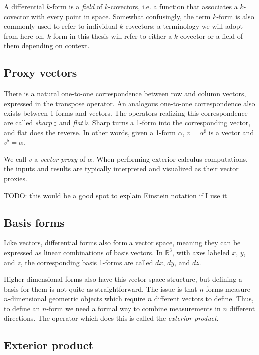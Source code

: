 \documentclass[utf8,english]{gradu3}
\begin{document}
A differential $k$-form is a \textit{field} of $k$-covectors,
i.e. a function that associates a $k$-covector with every point in space.
Somewhat confusingly, the term $k$-form is also commonly used to
refer to individual $k$-covectors;
a terminology we will adopt from here on.
$k$-form in this thesis will refer to either a $k$-covector
or a field of them depending on context.


\subsection{Proxy vectors}

There is a natural one-to-one correspondence between row and column vectors,
expressed in the transpose operator.
An analogous one-to-one correspondence also exists between 1-forms and vectors.
The operators realizing this correspondence are called
\textit{sharp} $\sharp$ and \textit{flat} $\flat$.
Sharp turns a 1-form into the corresponding vector,
and flat does the reverse.
In other words, given a 1-form $\alpha$,
$v = \alpha^{\sharp}$ is a vector and $v^{\flat} = \alpha$.

We call $v$ a \textit{vector proxy} of $\alpha$.
When performing exterior calculus computations,
the inputs and results are typically interpreted
and visualized as their vector proxies.

TODO: this would be a good spot to explain Einstein notation if I use it


\subsection{Basis forms}

Like vectors, differential forms also form a vector space,
meaning they can be expressed as linear combinations of basis vectors.
In $\mathbb{R}^3$, with axes labeled $x$, $y$, and $z$,
the corresponding basis 1-forms are called $dx$, $dy$, and $dz$.

Higher-dimensional forms also have this vector space structure,
but defining a basis for them is not quite as straightforward.
The issue is that $n$-forms measure $n$-dimensional geometric objects
which require $n$ different vectors to define.
Thus, to define an $n$-form we need a formal way to combine
measurements in $n$ different directions.
The operator which does this is called the \textit{exterior product}.


\subsection{Exterior product}
\end{document}
